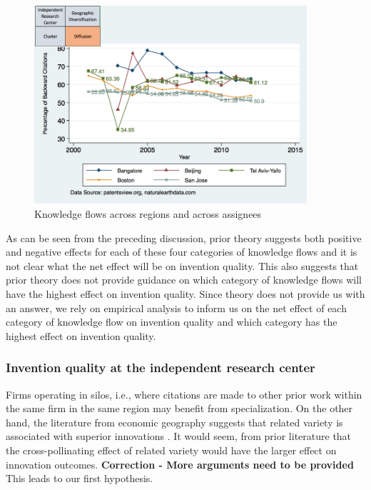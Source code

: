 \documentclass[12pt,letterpaper]{article}
\begin{document}
\begin{figure}[h!]
\begin{centering}
  \caption{Knowledge flows across regions and across assignees}
  \label{fig:SMSDiffRegionDiffAssigneeFlows}
  \includegraphics[width=0.90\textwidth]{SMSDiffRegionDiffAssigneeFlows}
\end{centering}
\end{figure}

As can be seen from the preceding discussion, prior theory suggests both positive and negative effects for each of these four categories of knowledge flows and it is not clear what the net effect will be on invention quality. This also suggests that prior theory does not provide guidance on which category of knowledge flows will have the highest effect on invention quality.  Since theory does not provide us with an answer, we rely on empirical analysis to inform us on the net effect of each category of knowledge flow on invention quality and which category has the highest effect on invention quality. \par


\subsubsection{Invention quality at the independent research center}
Firms operating in silos, i.e., where citations are made to other prior work within the same firm in the same region may benefit from specialization. On the other hand, the literature from economic geography suggests that related variety is associated with superior innovations  \citep{Boschma2009, Frenken2007}. It would seem, from prior literature that the cross-pollinating effect of related variety would have the larger effect on innovation outcomes\citep{todo}. \textbf{Correction - More arguments need to be provided} This leads to our first hypothesis.\\
\end{document}
